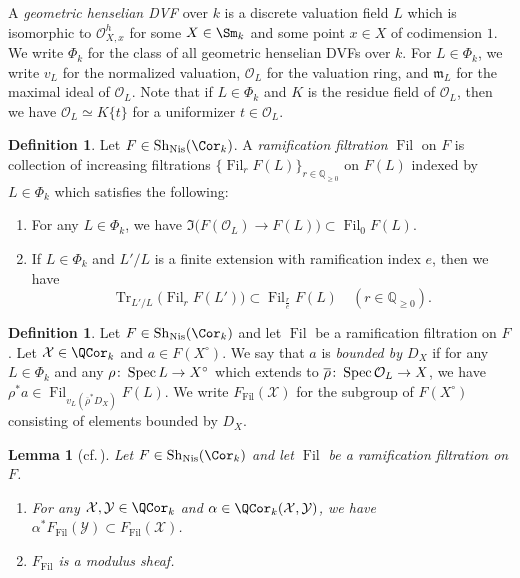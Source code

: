 \documentclass{amsart}
\theoremstyle{plain}
\newtheorem{lemma}[theorem]{Lemma}
\theoremstyle{definition}
\newtheorem{definition}[theorem]{Definition}
\theoremstyle{remark}
\numberwithin{equation}{section}
\DeclareMathOperator{\Sh}{Sh}
\DeclareMathOperator{\Fil}{Fil}
\DeclareMathOperator{\Tr}{Tr}
\def\Nis{\mathrm{Nis}}
\begin{document}
A \emph{geometric henselian DVF} over $k$ is a discrete valuation field $L$ which is isomorphic to $\mathcal{O}^h_{X,x}$ for some $X\in \Sm_k$ and some point $x\in X$ of codimension $1$.
We write $\Phi_k$ for the class of all geometric henselian DVFs over $k$.
For $L\in \Phi_k$, we write $v_L$ for the normalized valuation, $\mathcal{O}_L$ for the valuation ring, and $\mathfrak{m}_L$ for the maximal ideal of $\mathcal{O}_L$.
Note that if $L\in \Phi_k$ and $K$ is the residue field of $\mathcal{O}_L$, then we have $\mathcal{O}_L\simeq K\{t\}$ for a uniformizer $t\in \mathcal{O}_L$.

\begin{definition}\label{def:ram_fil}
	Let $F\in \Sh_\Nis(\Cor_k)$.
	A \emph{ramification filtration} $\Fil$ on $F$ is collection of increasing filtrations $\{\Fil_r F(L)\}_{r\in \mathbb{Q}_{\geq 0}}$ on $F(L)$ indexed by $L\in \Phi_k$ which satisfies the following:
	\begin{enumerate}
		\item	For any $L\in \Phi_k$, we have $\Im\bigl(F(\mathcal{O}_L)\to F(L)\bigr)\subset \Fil_0F(L)$.
		\item	If $L\in \Phi_k$ and $L'/L$ is a finite extension with ramification index $e$, then we have
				$$
					\Tr_{L'/L}\bigl(\Fil_r F(L')\bigr)\subset \Fil_{\frac{r}{e}}F(L)\quad (r\in \mathbb{Q}_{\geq 0}).
				$$
	\end{enumerate}
\end{definition}

\begin{definition}
	Let $F\in \Sh_\Nis(\Cor_k)$ and let $\Fil$ be a ramification filtration on $F$.
	Let $\mathcal{X}\in \QCor_k$ and $a\in F(X^\circ)$.
	We say that $a$ is \emph{bounded by $D_X$} if for any $L\in \Phi_k$ and any $\rho\colon \operatorname{Spec} L\to X^\circ$ which extends to $\overline{\rho}\colon \operatorname{Spec} \mathcal{O}_L\to X$, we have $\rho^*a\in \Fil_{v_L(\overline{\rho}^*D_X)}F(L)$.
	We write $F_{\Fil}(\mathcal{X})$ for the subgroup of $F(X^\circ)$ consisting of elements bounded by $D_X$.
\end{definition}

\begin{lemma}[cf.\,{\cite[Proposition 4.7]{RS21}}]\label{lem:ram_fil}
	Let $F\in \Sh_\Nis(\Cor_k)$ and let $\Fil$ be a ramification filtration on $F$.
	\begin{enumerate}
		\item	For any $\mathcal{X},\mathcal{Y}\in \QCor_k$ and $\alpha\in \QCor_k(\mathcal{X},\mathcal{Y})$, we have $\alpha^*F_{\Fil} (\mathcal{Y})\subset F_{\Fil} (\mathcal{X})$.
		\item	$F_{\Fil}$ is a modulus sheaf.
	\end{enumerate}
\end{lemma}
\end{document}

